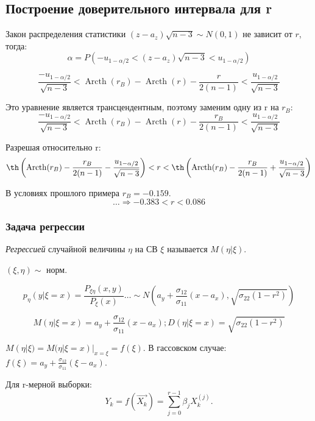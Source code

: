 \subsection{Построение доверительного интервала для r}

Закон распределения статистики $(z-a_z) \sqrt{n-3} \sim N(0, 1)$ не зависит от $r$, тогда:
\[
  \alpha = P(-u_{1-\alpha/2} < (z-a_z) \sqrt{n-3} < u_{1 - \alpha/2})
\]

\[
  \frac{-u_{1-\alpha/2}}{\sqrt{n-3}} < \operatorname{Arcth} (r_B) - \operatorname{Arcth} (r) - \frac{r}{2(n-1)} < \frac{u_{1-\alpha/2}}{\sqrt{n-3}}
\]

Это уравнение является трансцендентным, поэтому заменим одну из r на $r_B$:
\[
  \frac{-u_{1-\alpha/2}}{\sqrt{n-3}} < \operatorname{Arcth} (r_B) - \operatorname{Arcth} (r) - \frac{r_B}{2(n-1)} < \frac{u_{1-\alpha/2}}{\sqrt{n-3}}
\]

Разрешая относительно r:
\[
  \th \left( \operatorname{Arcth}(r_B) - \frac{r_B}{2(n-1)} - \frac{u_{1-\alpha/2}}{\sqrt{n-3}} \right)
  < r
  < \th \left( \operatorname{Arcth}(r_B) - \frac{r_B}{2(n-1)} + \frac{u_{1-\alpha/2}}{\sqrt{n-3}} \right)
\]

\begin{ex}
  В условиях прошлого примера $r_B = -0.159$.
  \[
    \dots \Rightarrow -0.383 < r < 0.086
  \]
\end{ex}

\subsubsection{Задача регрессии}

\begin{definition}
  \emph{Регрессией} случайной величины $\eta$ на СВ $\xi$ называется $M(\eta | \xi)$.   
\end{definition}

\begin{ex}
  $(\xi, \eta) \sim$ норм.

  \[
    p_\eta (y | \xi=x) = \frac{P_{\xi\eta} (x, y)}{P_\xi(x)} \dots \sim N\left(a_y+\frac{\sigma_{12}}{\sigma_{11}}(x-a_x), \sqrt{\sigma_{22} (1-r^2)}\right)
  \]

  \[
    M(\eta | \xi=x) = a_y + \frac{\sigma_{12}}{\sigma_{11}} (x-a_x);
    D(\eta | \xi=x) = \sqrt{\sigma_{22} (1-r^2) }
  \]

  $M(\eta | \xi) = M(\eta | \xi=x) |_{x=\xi} = f(\xi)$.
  В гассовском случае:
  $f(\xi) = a_y + \frac{\sigma_{12}}{\sigma_{11}} (\xi - a_x)$.

  Для r-мерной выборки:
  \[
    Y_k = f(\vec{X_k}) = \sum_{j=0}^{r-1} \beta_j X_k^{(j)}.
  \]
\end{ex}

